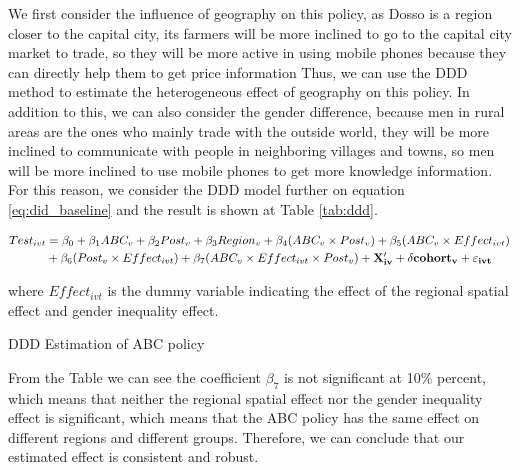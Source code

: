 \documentclass[12pt]{jfm}
\begin{document}
We first consider the influence of geography on this policy, as Dosso is a region closer to the capital city, its farmers will be more inclined to go to the capital city market to trade, so they will be more active in using mobile phones because they can directly help them to get price information \citep{doi:10.1080/02681102.2015.1048184} Thus, we can use the DDD method to estimate the heterogeneous effect of geography on this policy. In addition to this, we can also consider the gender difference, because men in rural areas are the ones who mainly trade with the outside world, they will be more inclined to communicate with people in neighboring villages and towns, so men will be more inclined to use mobile phones to get more knowledge information. For this reason, we consider the DDD model further on equation \eqref{eq:did_baseline} and the result is shown at Table \ref{tab:ddd}.

\begin{equation}
  \begin{aligned}
  Test_{ivt} & = \beta_0 + \beta_1 ABC_{v} + \beta_2 Post_{v} + \beta_3 Region_{v} + \beta_4 (ABC_v \times Post_v) + \beta_5 (ABC_v \times Effect_{ivt}) \\
  & + \beta_6 (Post_v \times Effect_{ivt}) + \beta_7 (ABC_v \times Effect_{ivt} \times Post_v) + \bf{X}_{iv}^\prime + \delta cohort_{v} + \varepsilon_{ivt}  \label{eq:ddd}
  \end{aligned}
\end{equation}

where $Effect_{ivt}$ is the dummy variable indicating the effect of the regional spatial effect and gender inequality effect.

\begin{table}
  \begin{center}
    \begin{footnotesize}
    \caption{DDD Estimation of ABC policy}
    \label{tab:ddd}
    
    \end{footnotesize}
  \end{center}
\end{table}

From the Table we can see the coefficient $\beta_7$ is not significant at 10\% percent, which means that neither the regional spatial effect nor the gender inequality effect is significant, which means that the ABC policy has the same effect on different regions and different groups. Therefore, we can conclude that our estimated effect is consistent and robust.
\end{document}

